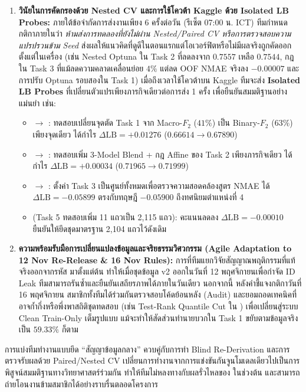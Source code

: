 \begin{enumerate}
  \item \textbf{วินัยในการคัดกรองด้วย Nested CV และการใช้โควต้า Kaggle ด้วย Isolated LB Probes:}
  ภายใต้ข้อจำกัดการส่งงานเพียง 6 ครั้งต่อวัน (รีเซ็ต 07:00 น. ICT) ทีมกำหนดกติกาภายในว่า \emph{ห้ามส่งการทดลองที่ยังไม่ผ่าน Nested/Paired CV หรือการตรวจสอบความแปรปรวนข้าม Seed} ส่งผลให้แนวคิดที่ดูดีในตอนแรกแต่โอเวอร์ฟิตหรือไม่มีผลจริงถูกคัดออกตั้งแต่ในเครื่อง (เช่น Nested Optuna ใน Task 2 ที่ลดลงจาก $0.7557$ เหลือ $0.7544$, กฎ  ใน Task 3 ที่แม้ลดความคลาดเคลื่อนย่อย $4\%$ แต่ลด OOF NMAE จริงลง $-0.00007$ และการปรับ Optuna รอบสองใน Task 1) เมื่อถึงเวลาใช้โควต้าบน Kaggle ทีมจะส่ง \textbf{Isolated LB Probes} ที่เปลี่ยนตัวแปรเพียงภารกิจเดียวต่อการส่ง 1 ครั้ง เพื่อยืนยันสมมติฐานอย่างแม่นยำ เช่น:
  \begin{itemize}
    \item {} $\to$ : ทดสอบเปลี่ยนจุดตัด Task 1 จาก Macro-$F_2$ ($41\%$) เป็น Binary-$F_2$ ($63\%$) เพียงจุดเดียว ได้กำไร $\Delta \text{LB} = +0.01276$ ($0.66614 \to 0.67890$)
    \item {} $\to$ : ทดสอบเพิ่ม 3-Model Blend + กฎ Affine ของ Task 2 เพียงภารกิจเดียว ได้กำไร $\Delta \text{LB} = +0.00034$ ($0.71965 \to 0.71999$)
    \item {} $\to$ : ตั้งค่า Task 3 เป็นศูนย์ทั้งหมดเพื่อตรวจความสอดคล้องสูตร NMAE ได้ $\Delta \text{LB} = -0.05899$ ตรงกับทฤษฎี $-0.05900$ ถึงทศนิยมตำแหน่งที่ 4
    \item {} (Task 5 ทดสอบเพิ่ม 11 แถวเป็น 2,115 แถว): คะแนนลดลง $\Delta \text{LB} = -0.00010$ ยืนยันให้ยึดชุดมาตรฐาน 2,104 แถวไว้ดังเดิม
  \end{itemize}

  \item \textbf{ความพร้อมรับมือการเปลี่ยนแปลงข้อมูลและจริยธรรมวิศวกรรม (Agile Adaptation to 12 Nov Re-Release \& 16 Nov Rules):}
  การที่ทีมแยกวิจัยสัญญาณพฤติกรรมที่แท้จริงออกจากรหัส  มาตั้งแต่ต้น ทำให้เมื่อชุดข้อมูล v2 ออกในวันที่ 12 พฤศจิกายนเพื่อกำจัด ID Leak ทีมสามารถรันซ้ำและยืนยันเสถียรภาพได้ภายในวันเดียว นอกจากนี้ หลังคำชี้แจงกติกาวันที่ 16 พฤศจิกายน สมาชิกทั้งทีมได้ร่วมกันตรวจสอบโค้ดย้อนหลัง (Audit) และยอมถอดเทคนิคที่อาจก้ำกึ่งหรือพึ่งพาสถิติชุดทดสอบ (เช่น Test-Rank Quantile Cut ใน ) เพื่อเปลี่ยนสู่ระบบ Clean Train-Only เต็มรูปแบบ แม้จะทำให้สัดส่วนทำนายบวกใน Task 1 ขยับตามข้อมูลจริงเป็น $59.33\%$ ก็ตาม
\end{enumerate}

\begin{insightbox}
การแบ่งทีมทำงานแบบยึด ``สัญญาข้อมูลกลาง'' ควบคู่กับการทำ Blind Re-Derivation และการตรวจรับผลด้วย Paired/Nested CV เปลี่ยนการทำงานจากการแข่งขันกันจูนโมเดลเดียวไปเป็นการพิสูจน์สมมติฐานทางวิทยาศาสตร์ร่วมกัน ทำให้ทีมไม่หลงทางกับผลรั่วไหลของ  ในช่วงต้น และสามารถถ่ายโอนงานข้ามสมาชิกได้อย่างราบรื่นตลอดโครงการ
\end{insightbox}
